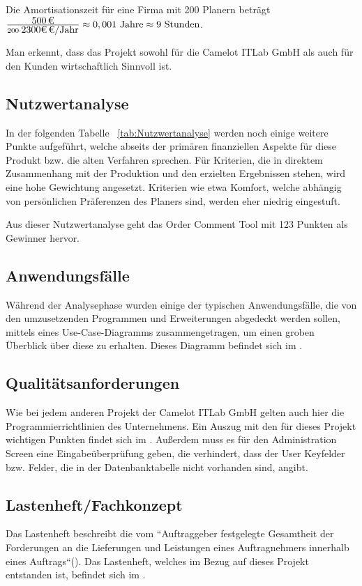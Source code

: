 Die Amortisationszeit für eine Firma mit 200 Planern beträgt
$\frac{\eur{500}}{200 \cdot \eur{2300€} \mbox{/Jahr} } \approx 0,001 \mbox{ Jahre} \approx 9 \mbox{ Stunden}$.

Man erkennt, dass das Projekt sowohl für die Camelot ITLab GmbH als auch für den Kunden wirtschaftlich Sinnvoll ist.

\subsection{Nutzwertanalyse}
\label{sec:Nutzwertanalyse}
In der folgenden Tabelle ~\ref{tab:Nutzwertanalyse} werden noch einige weitere Punkte aufgeführt, welche abseits der primären finanziellen Aspekte für diese Produkt bzw. die alten Verfahren sprechen. Für Kriterien, die in direktem Zusammenhang mit der Produktion und den erzielten Ergebnissen stehen, wird eine hohe Gewichtung angesetzt. Kriterien wie etwa Komfort, welche abhängig von persönlichen Präferenzen des Planers sind, werden eher niedrig eingestuft.


Aus dieser Nutzwertanalyse geht das Order Comment Tool mit 123 Punkten als Gewinner hervor.

\subsection{Anwendungsfälle}
\label{sec:Anwendungsfaelle}
Während der Analysephase wurden einige der typischen Anwendungsfälle, die von den umzusetzenden Programmen und Erweiterungen abgedeckt werden sollen, mittels eines Use-Case-Diagramms zusammengetragen, um einen groben Überblick über diese zu erhalten. Dieses Diagramm befindet sich im .

\subsection{Qualitätsanforderungen}
\label{sec:Qualitaetsanforderungen}
Wie bei jedem anderen Projekt der Camelot ITLab GmbH gelten auch hier die Programmierrichtlinien des Unternehmens. Ein Auszug mit den für dieses Projekt wichtigen Punkten findet sich im . Außerdem muss es für den Administration Screen eine Eingabeüberprüfung geben, die verhindert, dass der User Keyfelder bzw. Felder, die in der Datenbanktabelle nicht vorhanden sind, angibt.

\subsection{Lastenheft/Fachkonzept}
\label{sec:Lastenheft}
Das Lastenheft beschreibt die vom ``Auftraggeber festgelegte Gesamtheit der Forderungen an die Lieferungen und Leistungen eines Auftragnehmers innerhalb eines Auftrags``(\cite{Wiki.Induux}). Das Lastenheft, welches im Bezug auf dieses Projekt entstanden ist, befindet sich im . 

